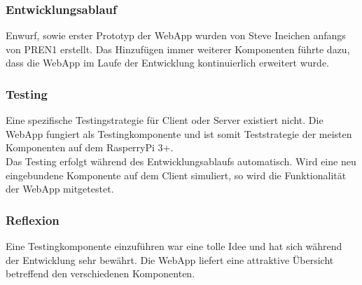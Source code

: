 \documentclass[../../main.tex]{subfiles}
\begin{document}
\subsubsection{Entwicklungsablauf}
Enwurf, sowie erster Prototyp der WebApp wurden von Steve Ineichen anfangs von PREN1 erstellt. Das Hinzufügen immer weiterer Komponenten führte dazu, dass die WebApp im Laufe der Entwicklung kontinuierlich erweitert wurde.

\subsubsection{Testing}
Eine spezifische Testingstrategie für Client oder Server existiert nicht. Die WebApp fungiert als Testingkomponente und ist somit Teststrategie der meisten Komponenten auf dem RasperryPi 3+.
\\
Das Testing erfolgt während des Entwicklungsablaufs automatisch. Wird eine neu eingebundene Komponente auf dem Client simuliert, so wird die Funktionalität der WebApp mitgetestet.

\subsubsection{Reflexion}
Eine Testingkomponente einzuführen war eine tolle Idee und hat sich während der Entwicklung sehr bewährt. Die WebApp liefert eine attraktive Übersicht betreffend den verschiedenen Komponenten.
\end{document}

